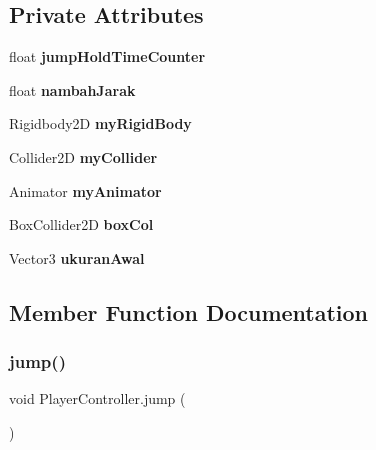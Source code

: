 \subsection*{Private Attributes}
\begin{DoxyCompactItemize}
\item 
\hypertarget{class_player_controller_a964dd786d816edf28dfb22e076e7fb6e}{}\label{class_player_controller_a964dd786d816edf28dfb22e076e7fb6e} 
float {\bfseries jump\+Hold\+Time\+Counter}
\item 
\hypertarget{class_player_controller_a1b529005d052b11fe8843e3fa6de3a2a}{}\label{class_player_controller_a1b529005d052b11fe8843e3fa6de3a2a} 
float {\bfseries nambah\+Jarak}
\item 
\hypertarget{class_player_controller_ae7c227462646c52ac0b35517303ea57d}{}\label{class_player_controller_ae7c227462646c52ac0b35517303ea57d} 
Rigidbody2D {\bfseries my\+Rigid\+Body}
\item 
\hypertarget{class_player_controller_a0e793baf5b00ac0d6bcf367060db5f55}{}\label{class_player_controller_a0e793baf5b00ac0d6bcf367060db5f55} 
Collider2D {\bfseries my\+Collider}
\item 
\hypertarget{class_player_controller_a34fe46e66072a17354236ce4c9909767}{}\label{class_player_controller_a34fe46e66072a17354236ce4c9909767} 
Animator {\bfseries my\+Animator}
\item 
\hypertarget{class_player_controller_a51abe7ff34134e22526284c8492ac2af}{}\label{class_player_controller_a51abe7ff34134e22526284c8492ac2af} 
Box\+Collider2D {\bfseries box\+Col}
\item 
\hypertarget{class_player_controller_abe1551a2d9b41ba6c7ce2895867eea18}{}\label{class_player_controller_abe1551a2d9b41ba6c7ce2895867eea18} 
Vector3 {\bfseries ukuran\+Awal}
\end{DoxyCompactItemize}


\subsection{Member Function Documentation}
\hypertarget{class_player_controller_a413e8e34033169093b21b38bf6bd0b34}{}\label{class_player_controller_a413e8e34033169093b21b38bf6bd0b34} 
\subsubsection{\texorpdfstring{jump()}{jump()}}
{\footnotesize\ttfamily void Player\+Controller.\+jump (\begin{DoxyParamCaption}{ }\end{DoxyParamCaption})\hspace{0.3cm}{\ttfamily [private]}}



